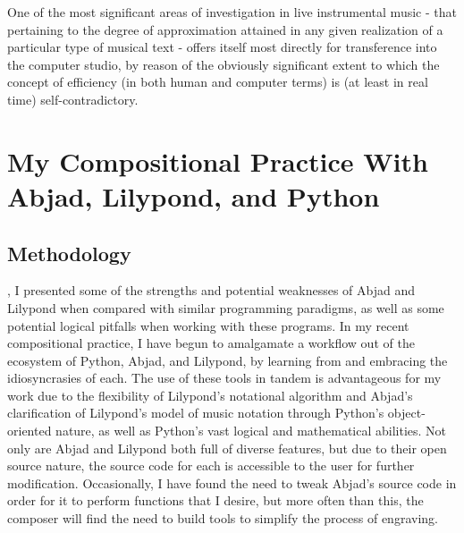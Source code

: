 \begin{savequote}[75mm] 
One of the most significant areas of investigation in live instrumental music - that pertaining to the degree of approximation attained in any given realization of a particular type of musical text - offers itself most directly for transference into the computer studio, by reason of the obviously significant extent to which the concept of efficiency (in both human and computer terms) is (at least in real time) self-contradictory. \\
\citeyearpar[Composer-Computer-Active Form par.3]{Ferneyhough}
\end{savequote}

\chapter{My Compositional Practice With Abjad, Lilypond, and Python}
\doublespace
	\section{Methodology}

\pagestyle{fancy}
\renewcommand\headrulewidth{0pt}
\lhead{}\chead{}\rhead{}
\cfoot{\vspace*{1.5\baselineskip}\thepage}

, I presented some of the strengths and potential weaknesses of Abjad and Lilypond when compared with similar programming paradigms, as well as some potential logical pitfalls when working with these programs. In my recent compositional practice, I have begun to amalgamate a workflow out of the ecosystem of Python, Abjad, and Lilypond, by learning from and embracing the idiosyncrasies of each. The use of these tools in tandem is advantageous for my work due to the flexibility of Lilypond's notational algorithm and Abjad’s clarification of Lilypond’s model of music notation through Python’s object-oriented nature, as well as Python’s vast logical and mathematical abilities. Not only are Abjad and Lilypond both full of diverse features, but due to their open source nature, the source code for each is accessible to the user for further modification. Occasionally, I have found the need to tweak Abjad's source code in order for it to perform functions that I desire, but more often than this, the composer will find the need to build tools to simplify the process of engraving.

